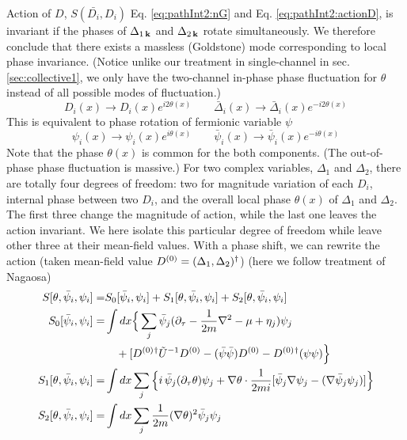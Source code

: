  Action of $D$, $S(\bar{D_i},D_i)$ Eq. \eqref{eq:pathInt2:nG} and Eq. \eqref{eq:pathInt2:actionD}, is invariant if the phases of $\Delta_{1\,\mathbf{k}}$ and $\Delta_{2\,\mathbf{k}}$ rotate simultaneously. We therefore conclude that there exists a massless (Goldstone) mode corresponding to local phase invariance. (Notice unlike our treatment in single-channel in sec. \ref{sec:collective1}, we only have the two-channel in-phase phase fluctuation for $\theta$ instead of all possible modes of fluctuation.)
\begin{equation*}
D_{i}(x)\rightarrow{}D_{i}(x)e^{i2\theta(x)}\qquad{}
\bar{\Delta}_{i}(x)\rightarrow{}\bar{\Delta}_{i}(x)e^{-i2\theta(x)}
\end{equation*}
This is equivalent to  phase  rotation of fermionic variable $\psi$
\begin{equation*}
\psi_{i}(x)\rightarrow{}\psi_{i}(x)e^{i\theta(x)}\qquad{}
\bar{\psi}_{i}(x)\rightarrow{}\bar{\psi}_{i}(x)e^{-i\theta(x)}
\end{equation*}
Note that the phase $\theta(x)$ is common for the both components. (The out-of-phase phase fluctuation is massive.) For two complex variables, $\Delta_1$ and $\Delta_2$, there are totally four degrees of freedom: two for magnitude variation of each $D_i$,  internal phase between two $D_i$, and the overall local phase $\theta(x)$ of $\Delta_1$ and $\Delta_2$.  The first three change the magnitude of action, while the last one leaves the action invariant.  We here isolate this particular degree of freedom while leave other three at their mean-field values. With a phase shift, we can rewrite the action (taken mean-field value $D^{(0)}=(\Delta_1,\Delta_2)^{\dagger}$) (here we  follow treatment of Nagaosa\cite{Nagaosa})
\begin{subequations}
\begin{align}\label{eq:pathInt2:actionPhase}
S[\theta,\bar\psi_{i},\psi_{i}]=&S_0[\bar\psi_{i},\psi_{i}]+S_1[\theta,\bar\psi_{i},\psi_{i}]+S_2[\theta,\bar\psi_{i},\psi_{i}]\\
S_0[\bar\psi_{i},\psi_{i}]=&\int{dx}
\Big\{\sum_{j}\bar\psi_{j}(\partial_\tau-\frac{1}{2m}\nabla^{2}-\mu+\eta_{j})\psi_{j}\nonumber\\
&\quad+[D^{(0)}{}^{\dagger}\tilde{U}^{-1}D^{(0)}-(\bar\psi\bar\psi)D^{(0)}-{D^{(0)}}{}^{\dagger}(\psi\psi)\Big\}\\
S_1[\theta,\bar\psi_{i},\psi_{i}]=&\int{dx}\sum_{j}\Big\{
   i\,\bar\psi_{j}(\partial_{\tau}\theta)\psi_{j}+\nabla\theta\cdot\frac{1}{2mi}[\bar\psi_{j}\nabla\psi_{j}-(\nabla\bar{\psi}_{j}\psi_{j})]\Big\}\\
S_2[\theta,\bar\psi_{i},\psi_{i}]=&\int{dx}\sum_{j}\frac{1}{2m}(\nabla\theta)^{2}\bar\psi_{j}\psi_{j}
\end{align}
\end{subequations}
